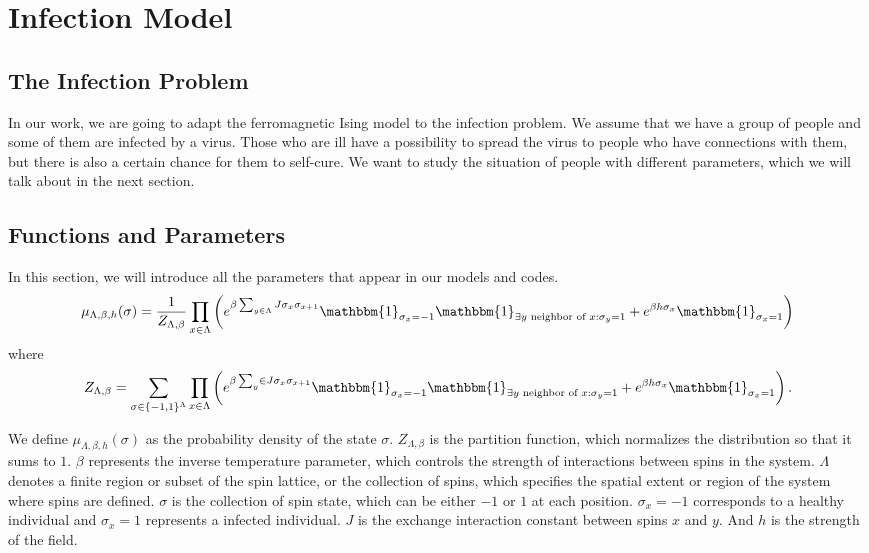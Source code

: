 \documentclass[11pt]{book}
\begin{document}
\section{Infection Model}
\subsection{The Infection Problem}
In our work, we are going to adapt the ferromagnetic Ising model to the infection problem. We assume that we have a group of people and some of them are infected by a virus. Those who are ill have a possibility to spread the virus to people who have connections with them, but there is also a certain chance for them to self-cure. We want to study the situation of people with different parameters, which we will talk about in the next section.

\subsection{Functions and Parameters}
In this section, we will introduce all the parameters that appear in our models and codes.
\begin{equation}\label{Our_Infection_Model}
\mu_{\Lambda,\beta,h}(\sigma) = \frac{1}{Z_{\Lambda,\beta}} \prod_{x \in \Lambda} \left( e^{\beta \sum_{y \in \Lambda} J\sigma_{x}\sigma_{x+1}} \mathbbm{1}_{\sigma_x = -1}\mathbbm{1}_{\exists y \text{ neighbor of }x:\sigma_y=1} + e^{\beta h \sigma_x} \mathbbm{1}_{\sigma_x = 1} \right)
\end{equation}
where
\begin{equation}\label{Our_Partition_Function}
Z_{\Lambda,\beta} = \sum_{\sigma \in \{-1,1\}^\Lambda} \prod_{x \in \Lambda} \left( e^{\beta \sum_y\in J \sigma_{x}\sigma_{x+1}} \mathbbm{1}_{\sigma_x = -1}\mathbbm{1}_{\exists y \text{ neighbor of }x:\sigma_y=1} + e^{\beta h \sigma_x} \mathbbm{1}_{\sigma_x = 1} \right).
\end{equation}

We define $\mu_{\Lambda,\beta,h}(\sigma)$ as the probability density of the state $\sigma$. $Z_{\Lambda,\beta}$ is the partition function, which normalizes the distribution so that it sums to $1$. $\beta$ represents the inverse temperature parameter, which controls the strength of interactions between spins in the system. $\Lambda$ denotes a finite region or subset of the spin lattice, or the collection of spins, which specifies the spatial extent or region of the system where spins are defined. $\sigma$ is the collection of spin state, which can be either $-1$ or $1$ at each position. $\sigma_x = -1$ corresponds to a healthy individual and $\sigma_x = 1$ represents a infected individual. $J$ is the exchange interaction constant between spins $x$ and $y$. And $h$ is the strength of the field. 
\end{document}

